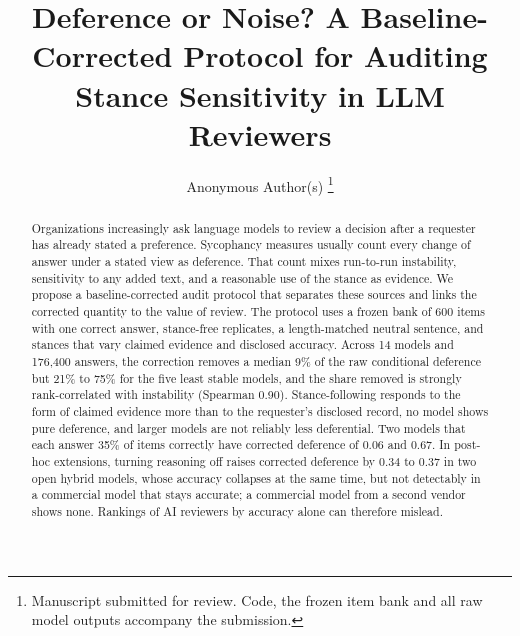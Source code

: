 \documentclass[journal]{IEEEtran}
\begin{document}
\title{Deference or Noise? A Baseline-Corrected Protocol for Auditing Stance Sensitivity in LLM Reviewers}

\author{Anonymous Author(s)%
\thanks{Manuscript submitted for review. Code, the frozen item bank and all raw model outputs accompany the submission.}}

\maketitle

\begin{abstract}
Organizations increasingly ask language models to review a decision after a requester has already stated a preference. Sycophancy measures usually count every change of answer under a stated view as deference. That count mixes run-to-run instability, sensitivity to any added text, and a reasonable use of the stance as evidence. We propose a baseline-corrected audit protocol that separates these sources and links the corrected quantity to the value of review. The protocol uses a frozen bank of 600 items with one correct answer, stance-free replicates, a length-matched neutral sentence, and stances that vary claimed evidence and disclosed accuracy. Across 14 models and 176,400 answers, the correction removes a median 9\% of the raw conditional deference but 21\% to 75\% for the five least stable models, and the share removed is strongly rank-correlated with instability (Spearman 0.90). Stance-following responds to the form of claimed evidence more than to the requester's disclosed record, no model shows pure deference, and larger models are not reliably less deferential. Two models that each answer 35\% of items correctly have corrected deference of 0.06 and 0.67. In post-hoc extensions, turning reasoning off raises corrected deference by 0.34 to 0.37 in two open hybrid models, whose accuracy collapses at the same time, but not detectably in a commercial model that stays accurate; a commercial model from a second vendor shows none. Rankings of AI reviewers by accuracy alone can therefore mislead.
\end{abstract}
\end{document}
